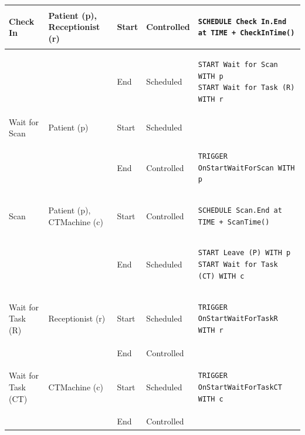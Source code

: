 \documentclass[
  10pt,
  a4paperpaper,
  DIV=11,
  numbers=noendperiod,
  oneside]{scrreprt}
\begin{document}
\begin{longtable}{@{}>{\raggedright\arraybackslash}p{1.8cm}>{\raggedright\arraybackslash}p{2.1cm}>{\raggedright\arraybackslash}p{0.9cm}>{\raggedright\arraybackslash}p{2.2cm}>{\raggedright\arraybackslash}p{8cm}@{}}
  \\ \midrule
  Check In & Patient (p), Receptionist (r)  & Start & Controlled  & 
  \vspace{-12pt}
  \begin{lstlisting}[language=CMPseudo]
SCHEDULE Check In.End at TIME + CheckInTime()
  \end{lstlisting}
  \\[-12pt] \cmidrule{3-5}
                    &              & End   & Scheduled &
  \vspace{-12pt}
  \begin{lstlisting}[language=CMPseudo]
START Wait for Scan WITH p
START Wait for Task (R) WITH r
  \end{lstlisting}          
  \\[-12pt] \midrule
  Wait for Scan & Patient (p)  & Start & Scheduled  &              \\ \cmidrule{3-5}
                &              & End   & Controlled &
  \vspace{-12pt}
  \begin{lstlisting}[language=CMPseudo]
TRIGGER OnStartWaitForScan WITH p
  \end{lstlisting}
  \\[-12pt] \midrule
  Scan & Patient (p), CTMachine (c)  & Start & Controlled  & 
  \vspace{-12pt}
  \begin{lstlisting}[language=CMPseudo]
SCHEDULE Scan.End at TIME + ScanTime()
  \end{lstlisting}
  \\[-12pt] \cmidrule{3-5}
                    &              & End   & Scheduled &
  \vspace{-12pt}
  \begin{lstlisting}[language=CMPseudo]
START Leave (P) WITH p
START Wait for Task (CT) WITH c
  \end{lstlisting}          
  \\[-12pt] \midrule
  Wait for Task (R) & Receptionist (r)  & Start & Scheduled  &
  \vspace{-12pt}
  \begin{lstlisting}[language=CMPseudo]
TRIGGER OnStartWaitForTaskR WITH r
  \end{lstlisting}
  \\[-12pt] \cmidrule{3-5}
                    &              & End   & Controlled &
  
  \\ \midrule
  Wait for Task (CT) & CTMachine (c)  & Start & Scheduled  &
  \vspace{-12pt}
  \begin{lstlisting}[language=CMPseudo]
TRIGGER OnStartWaitForTaskCT WITH c
  \end{lstlisting}
  \\[-12pt] \cmidrule{3-5}
                    &              & End   & Controlled &
  \\ \bottomrule
  

\end{longtable}
\end{document}
